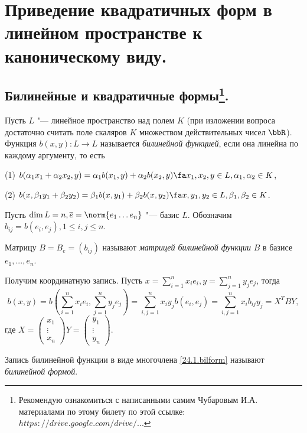 \chapter{Приведение квадратичных форм в линейном пространстве к каноническому виду.}

\section[Билинейные и квадратичные формы.]{Билинейные и квадратичные формы\footnote{Рекомендую ознакомиться с написанными самим Чубаровым И.А. материалами по этому билету по этой ссылке: \href{https://drive.google.com/drive/u/0/folders/0BzuzEyNkpwYDcFhhV1l2N1lhY2s}{$https://drive.google.com/drive/...$}}.}
  \begin{defn}  
  Пусть $L$ "--- линейное пространство над полем $K$ (при изложении вопроса достаточно считать поле скаляров $K$ множеством действительных чисел $\bbR$). 
Функция $b(x,y): L\rightarrow L$ называется \textit{билинейной функцией}, если она линейна по каждому аргументу, то есть

(1) $b(\alpha_1 x_1+\alpha_2 x_2,y)=\alpha_1 b(x_1,y)+\alpha_2 b(x_2,y) \fa x_1,x_2,y \in L, \alpha_1,\alpha_2 \in K$,

(2) $b(x,\beta_1 y_1+\beta_2 y_2)=\beta_1 b(x,y_1)+\beta_2 b(x,y_2)  \fa x,y_1,y_2 \in L, \beta_1,\beta_2 \in K$.
  \end{defn}
  Пусть $\dim L=n, \overline{e}=\norm{e_1 \ldots e_n}$ "--- базис $L$. Обозначим $b_{ij}=b(e_i,e_j), 1\le i,j \le n$.
  \begin{defn}
  Матрицу $B=B_e=(b_{ij})$ называют \textit{матрицей билинейной 	функции} $B$ в базисе $e_1,...,e_n$.
  \end{defn}
  
  Получим координатную запись. Пусть $x=\sum\limits_{i=1}^nx_ie_i,y=\sum\limits_{j=1}^ny_je_j$, тогда
  \begin{equation}\label{24.1.bilform}
  b(x,y)=b(\sum_{i=1}^nx_ie_i,\sum_{j=1}^ny_je_j)=\sum_{i,j=1}^nx_iy_jb(e_i,e_j)=\sum_{i,j=1}^nx_ib_{ij}y_j=X^TBY,
  \end{equation}
где $X=\begin{pmatrix}
x_1 \\ \vdots \\ x_n
\end{pmatrix} Y=\begin{pmatrix}
y_1 \\ \vdots \\ y_n
\end{pmatrix}$.
  \begin{defn}
  Запись билинейной функции в виде многочлена \eqref{24.1.bilform} называют \textit{билинейной формой}.
  \end{defn}


